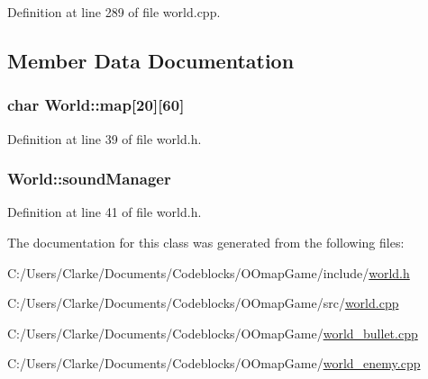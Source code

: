 Definition at line 289 of file world.\-cpp.



\subsection{Member Data Documentation}
\hypertarget{class_world_abb5635893b4f4c892c4fc034a9950adc}{
\subsubsection[{map}]{\setlength{\rightskip}{0pt plus 5cm}char World\-::map\mbox{[}20\mbox{]}\mbox{[}60\mbox{]}\hspace{0.3cm}{\ttfamily [protected]}}}\label{class_world_abb5635893b4f4c892c4fc034a9950adc}


Definition at line 39 of file world.\-h.

\hypertarget{class_world_a9985bb370d08feeff87c1d200afe26bc}{
\subsubsection[{sound\-Manager}]{ World\-::sound\-Manager\hspace{0.3cm}{\ttfamily [protected]}}}\label{class_world_a9985bb370d08feeff87c1d200afe26bc}


Definition at line 41 of file world.\-h.



The documentation for this class was generated from the following files\-:\begin{DoxyCompactItemize}
\item 
C\-:/\-Users/\-Clarke/\-Documents/\-Codeblocks/\-O\-Omap\-Game/include/\hyperlink{world_8h}{world.\-h}\item 
C\-:/\-Users/\-Clarke/\-Documents/\-Codeblocks/\-O\-Omap\-Game/src/\hyperlink{world_8cpp}{world.\-cpp}\item 
C\-:/\-Users/\-Clarke/\-Documents/\-Codeblocks/\-O\-Omap\-Game/\hyperlink{world__bullet_8cpp}{world\-\_\-bullet.\-cpp}\item 
C\-:/\-Users/\-Clarke/\-Documents/\-Codeblocks/\-O\-Omap\-Game/\hyperlink{world__enemy_8cpp}{world\-\_\-enemy.\-cpp}\end{DoxyCompactItemize}
